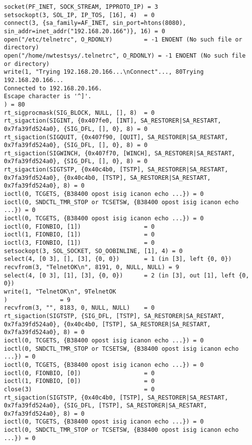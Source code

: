 \begin{lstlisting}[caption=Telnet成功時(手動),label=lst:telnet-success,linebackgroundcolor={\ifnum\value{lstnumber}>22 \ifnum\value{lstnumber}<29\color{green!30}\fi\fi}]
socket(PF_INET, SOCK_STREAM, IPPROTO_IP) = 3
setsockopt(3, SOL_IP, IP_TOS, [16], 4)  = 0
connect(3, {sa_family=AF_INET, sin_port=htons(8080), sin_addr=inet_addr("192.168.20.166")}, 16) = 0
open("/etc/telnetrc", O_RDONLY)         = -1 ENOENT (No such file or directory)
open("/home/nwtestsys/.telnetrc", O_RDONLY) = -1 ENOENT (No such file or directory)
write(1, "Trying 192.168.20.166...\nConnect"..., 80Trying 192.168.20.166...
Connected to 192.168.20.166.
Escape character is '^]'.
) = 80
rt_sigprocmask(SIG_BLOCK, NULL, [], 8)  = 0
rt_sigaction(SIGINT, {0x407fe0, [INT], SA_RESTORER|SA_RESTART, 0x7fa39fd524a0}, {SIG_DFL, [], 0}, 8) = 0
rt_sigaction(SIGQUIT, {0x407f90, [QUIT], SA_RESTORER|SA_RESTART, 0x7fa39fd524a0}, {SIG_DFL, [], 0}, 8) = 0
rt_sigaction(SIGWINCH, {0x407f70, [WINCH], SA_RESTORER|SA_RESTART, 0x7fa39fd524a0}, {SIG_DFL, [], 0}, 8) = 0
rt_sigaction(SIGTSTP, {0x40c4b0, [TSTP], SA_RESTORER|SA_RESTART, 0x7fa39fd524a0}, {0x40c4b0, [TSTP], SA_RESTORER|SA_RESTART, 0x7fa39fd524a0}, 8) = 0
ioctl(0, TCGETS, {B38400 opost isig icanon echo ...}) = 0
ioctl(0, SNDCTL_TMR_STOP or TCSETSW, {B38400 opost isig icanon echo ...}) = 0
ioctl(0, TCGETS, {B38400 opost isig icanon echo ...}) = 0
ioctl(0, FIONBIO, [1])                  = 0
ioctl(1, FIONBIO, [1])                  = 0
ioctl(3, FIONBIO, [1])                  = 0
setsockopt(3, SOL_SOCKET, SO_OOBINLINE, [1], 4) = 0
select(4, [0 3], [], [3], {0, 0})       = 1 (in [3], left {0, 0})
recvfrom(3, "TelnetOK\n", 8191, 0, NULL, NULL) = 9
select(4, [0 3], [1], [3], {0, 0})      = 2 (in [3], out [1], left {0, 0})
write(1, "TelnetOK\n", 9TelnetOK
)               = 9
recvfrom(3, "", 8183, 0, NULL, NULL)    = 0
rt_sigaction(SIGTSTP, {SIG_DFL, [TSTP], SA_RESTORER|SA_RESTART, 0x7fa39fd524a0}, {0x40c4b0, [TSTP], SA_RESTORER|SA_RESTART, 0x7fa39fd524a0}, 8) = 0
ioctl(0, TCGETS, {B38400 opost isig icanon echo ...}) = 0
ioctl(0, SNDCTL_TMR_STOP or TCSETSW, {B38400 opost isig icanon echo ...}) = 0
ioctl(0, TCGETS, {B38400 opost isig icanon echo ...}) = 0
ioctl(0, FIONBIO, [0])                  = 0
ioctl(1, FIONBIO, [0])                  = 0
close(3)                                = 0
rt_sigaction(SIGTSTP, {0x40c4b0, [TSTP], SA_RESTORER|SA_RESTART, 0x7fa39fd524a0}, {SIG_DFL, [TSTP], SA_RESTORER|SA_RESTART, 0x7fa39fd524a0}, 8) = 0
ioctl(0, TCGETS, {B38400 opost isig icanon echo ...}) = 0
ioctl(0, SNDCTL_TMR_STOP or TCSETSW, {B38400 opost isig icanon echo ...}) = 0

\end{lstlisting}
